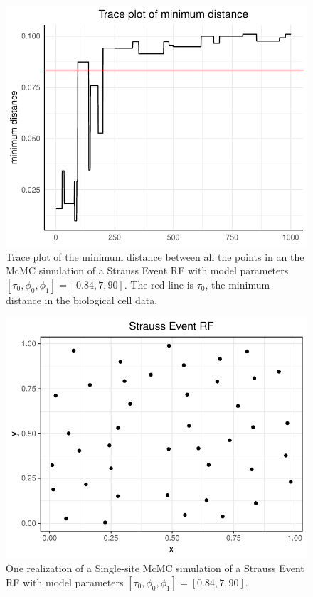 \begin{figure}
    \centering
    \includegraphics[scale=0.9]{figures/repulsive_trace_rf.pdf}
    \caption{Trace plot of the minimum distance between all the points in an the McMC simulation of a Strauss Event RF with model parameters $[\tau_0,\phi_0,\phi_1] = [0.84,7,90]$. The red line is $\tau_0$, the minimum distance in the biological cell data.}
    \label{fig:repulsive_trace}
\end{figure}

\begin{figure}
    \centering
    \includegraphics[scale=0.9]{figures/repulsive_event_rf.pdf}
    \caption{One realization of a Single-site McMC simulation of a Strauss Event RF with model parameters $[\tau_0,\phi_0,\phi_1] = [0.84,7,90]$.}
    \label{fig:repulsive_event_rf}
\end{figure}

